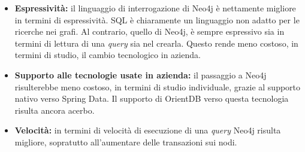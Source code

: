 \begin{itemize}
\item{\textbf{Espressività:}} il linguaggio di interrogazione di Neo4j è nettamente migliore in termini di espressività. SQL è chiaramente un linguaggio non adatto per le ricerche nei grafi. Al contrario, quello di Neo4j, è sempre espressivo sia in termini di lettura di una \textit{query} sia nel crearla. Questo rende meno costoso, in termini di studio, il cambio tecnologico in azienda. 
\item{\textbf{Supporto alle tecnologie usate in azienda:}} il passaggio a Neo4j risulterebbe meno costoso, in termini di studio individuale, grazie al supporto nativo verso Spring Data. Il supporto di OrientDB verso questa tecnologia risulta ancora acerbo.

\item{\textbf{Velocità:}} in termini di velocità di esecuzione di una \textit{query} Neo4j risulta migliore, sopratutto all'aumentare delle transazioni sui nodi.
\end{itemize}















